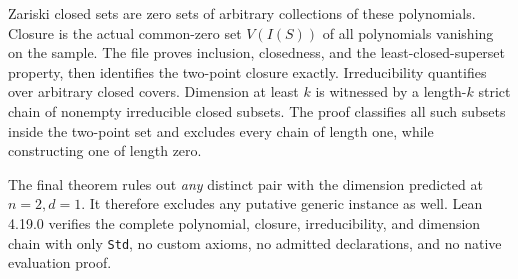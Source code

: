 \documentclass[11pt]{article}
\begin{document}
Zariski closed sets are zero sets of arbitrary collections of these
polynomials. Closure is the actual common-zero set $V(I(S))$ of all
polynomials vanishing on the sample. The file proves inclusion, closedness,
and the least-closed-superset property, then identifies the two-point
closure exactly. Irreducibility quantifies over arbitrary closed covers.
Dimension at least $k$ is witnessed by a length-$k$ strict chain of
nonempty irreducible closed subsets. The proof classifies all such subsets
inside the two-point set and excludes every chain of length one, while
constructing one of length zero.

The final theorem rules out \emph{any} distinct pair with the dimension
predicted at $n=2,d=1$. It therefore excludes any putative generic
instance as well. Lean 4.19.0 verifies the complete polynomial, closure,
irreducibility, and dimension chain with only \texttt{Std}, no custom
axioms, no admitted declarations, and no native evaluation proof.
\end{document}
